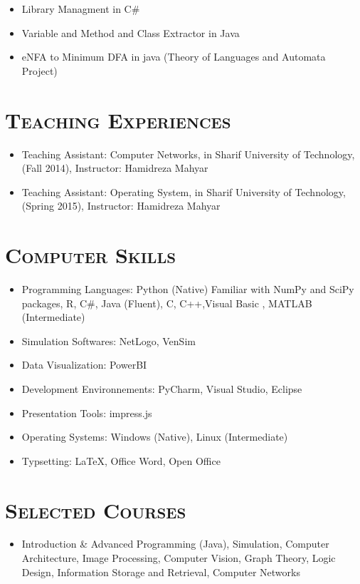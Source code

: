 \documentclass[line,margin]{res}
\begin{document}
\begin{resume}
\begin{spacing}{1.1}
\begin{itemize}
\item Library Managment in C\#
\item Variable and Method and Class Extractor in Java
\item eNFA to Minimum DFA in java (Theory of Languages and Automata Project)
\end{itemize}





\section{\textsc{Teaching Experiences}}
\begin{itemize}
\item  Teaching Assistant: Computer Networks, in Sharif University of Technology, (Fall 2014), Instructor:
Hamidreza Mahyar
\item Teaching Assistant: Operating System, in Sharif University of Technology, (Spring 2015), Instructor:
Hamidreza Mahyar
\end{itemize}

\section{\textsc{Computer
Skills}}
\begin{itemize}
\item  Programming Languages: Python (Native) Familiar with NumPy and SciPy packages, R, C\#, Java (Fluent), C, C++,Visual Basic , MATLAB (Intermediate)
\item Simulation Softwares: NetLogo, VenSim
\item Data Visualization: PowerBI
\item Development Environnements: PyCharm, Visual Studio, Eclipse
\item Presentation Tools: impress.js %
\item  Operating Systems: Windows (Native), Linux (Intermediate)
\item Typsetting: \LaTeX  , Office Word, Open Office
\end{itemize}

\section{\textsc{Selected Courses}}
\begin{itemize}
\item Introduction \& Advanced Programming (Java), Simulation, Computer Architecture, Image Processing, Computer Vision, 	Graph Theory, Logic Design, Information Storage and Retrieval, Computer Networks
\end{itemize}


\end{spacing}
\end{resume}
\end{document}
